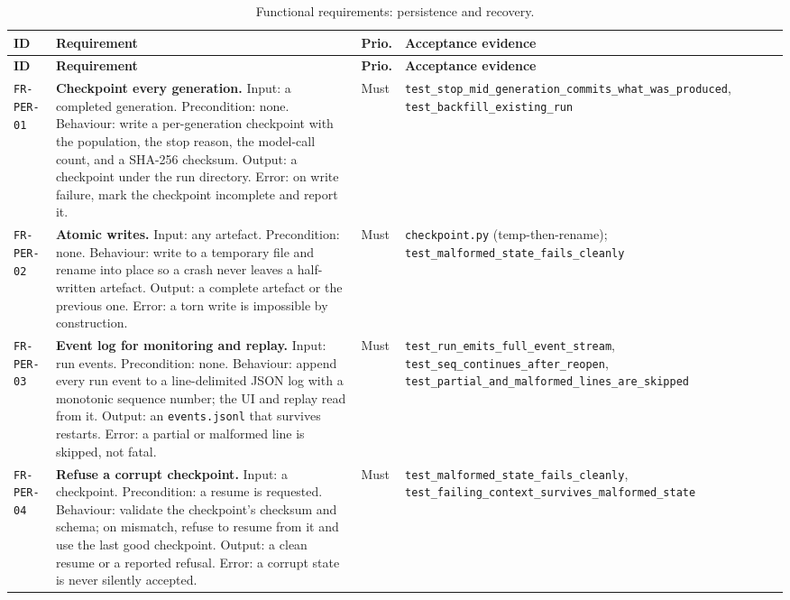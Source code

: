 \begin{longtable}{@{}>{\raggedright\arraybackslash}p{}>{\raggedright\arraybackslash}p{}p{}>{\raggedright\arraybackslash}p{}@{}}
\caption{Functional requirements: persistence and recovery.}\label{tab:fr-per}\\
\toprule
\textbf{ID} & \textbf{Requirement} & \textbf{Prio.} & \textbf{Acceptance evidence} \\
\midrule
\endfirsthead
\toprule
\textbf{ID} & \textbf{Requirement} & \textbf{Prio.} & \textbf{Acceptance evidence} \\
\midrule
\endhead
\bottomrule
\endfoot

\texttt{FR-PER-01} & \textbf{Checkpoint every generation.} Input: a completed
generation. Precondition: none. Behaviour: write a per-generation checkpoint with
the population, the stop reason, the model-call count, and a SHA-256 checksum.
Output: a checkpoint under the run directory. Error: on write failure, mark the
checkpoint incomplete and report it. & Must &
\texttt{test\_stop\_mid\_generation\_commits\_what\_was\_produced},
\texttt{test\_backfill\_existing\_run} \\
\addlinespace[2pt]

\texttt{FR-PER-02} & \textbf{Atomic writes.} Input: any artefact. Precondition:
none. Behaviour: write to a temporary file and rename into place so a crash never
leaves a half-written artefact. Output: a complete artefact or the previous one.
Error: a torn write is impossible by construction. & Must &
\texttt{checkpoint.py} (temp-then-rename); \texttt{test\_malformed\_state\_fails\_cleanly} \\
\addlinespace[2pt]

\texttt{FR-PER-03} & \textbf{Event log for monitoring and replay.} Input: run
events. Precondition: none. Behaviour: append every run event to a line-delimited
JSON log with a monotonic sequence number; the UI and replay read from it.
Output: an \texttt{events.jsonl} that survives restarts. Error: a partial or
malformed line is skipped, not fatal. & Must & \texttt{test\_run\_emits\_full\_event\_stream},
\texttt{test\_seq\_continues\_after\_reopen},
\texttt{test\_partial\_and\_malformed\_lines\_are\_skipped} \\
\addlinespace[2pt]

\texttt{FR-PER-04} & \textbf{Refuse a corrupt checkpoint.} Input: a checkpoint.
Precondition: a resume is requested. Behaviour: validate the checkpoint's
checksum and schema; on mismatch, refuse to resume from it and use the last good
checkpoint. Output: a clean resume or a reported refusal. Error: a corrupt state
is never silently accepted. & Must & \texttt{test\_malformed\_state\_fails\_cleanly},
\texttt{test\_failing\_context\_survives\_malformed\_state} \\
\bottomrule
\end{longtable}

